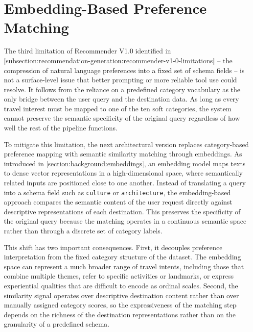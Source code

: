 \section{Embedding-Based Preference Matching}\label{section:recommendation-generation:embedding-matching}

The third limitation of Recommender V1.0 identified in \autoref{subsection:recommendation-generation:recommender-v1-0-limitations} -- the compression of natural language preferences into a fixed set of schema fields -- is not a surface-level issue that better prompting or more reliable tool use could resolve. It follows from the reliance on a predefined category vocabulary as the only bridge between the user query and the destination data. As long as every travel interest must be mapped to one of the ten soft categories, the system cannot preserve the semantic specificity of the original query regardless of how well the rest of the pipeline functions.

To mitigate this limitation, the next architectural version replaces category-based preference mapping with semantic similarity matching through embeddings. As introduced in \autoref{section:background:embeddings}, an embedding model maps texts to dense vector representations in a high-dimensional space, where semantically related inputs are positioned close to one another. Instead of translating a query into a schema field such as \texttt{culture} or \texttt{architecture}, the embedding-based approach compares the semantic content of the user request directly against descriptive representations of each destination. This preserves the specificity of the original query because the matching operates in a continuous semantic space rather than through a discrete set of category labels.

This shift has two important consequences. First, it decouples preference interpretation from the fixed category structure of the dataset. The embedding space can represent a much broader range of travel intents, including those that combine multiple themes, refer to specific activities or landmarks, or express experiential qualities that are difficult to encode as ordinal scales. Second, the similarity signal operates over descriptive destination content rather than over manually assigned category scores, so the expressiveness of the matching step depends on the richness of the destination representations rather than on the granularity of a predefined schema.

